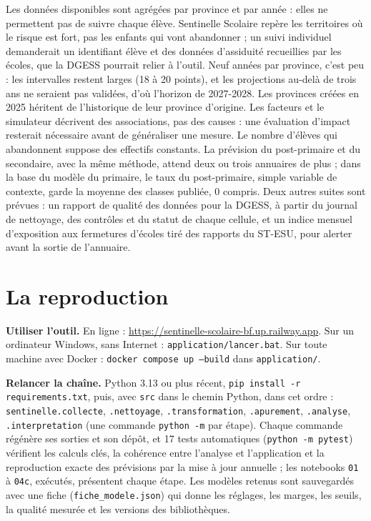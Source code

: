 \documentclass{article}
\newcommand{\sol}{Sentinelle Scolaire}
\newcommand{\lien}{\url{https://sentinelle-scolaire-bf.up.railway.app}}
\begin{document}
Les données disponibles sont agrégées par province et par année : elles ne permettent pas de suivre chaque élève. \sol{} repère les territoires où le risque est fort, pas les enfants qui vont abandonner ; un suivi individuel demanderait un identifiant élève et des données d'assiduité recueillies par les écoles, que la DGESS pourrait relier à l'outil. Neuf années par province, c'est peu : les intervalles restent larges (18 à 20 points), et les projections au-delà de trois ans ne seraient pas validées, d'où l'horizon de 2027-2028. Les provinces créées en 2025 héritent de l'historique de leur province d'origine. Les facteurs et le simulateur décrivent des associations, pas des causes : une évaluation d'impact resterait nécessaire avant de généraliser une mesure. Le nombre d'élèves qui abandonnent suppose des effectifs constants. La prévision du post-primaire et du secondaire, avec la même méthode, attend deux ou trois annuaires de plus ; dans la base du modèle du primaire, le taux du post-primaire, simple variable de contexte, garde la moyenne des classes publiée, 0 compris. Deux autres suites sont prévues : un rapport de qualité des données pour la DGESS, à partir du journal de nettoyage, des contrôles et du statut de chaque cellule, et un indice mensuel d'exposition aux fermetures d'écoles tiré des rapports du ST-ESU, pour alerter avant la sortie de l'annuaire.

\section{La reproduction}

\textbf{Utiliser l'outil.} En ligne : \lien. Sur un ordinateur Windows, sans Internet : \texttt{application/lancer.bat}. Sur toute machine avec Docker : \texttt{docker compose up --build} dans \texttt{application/}.

\textbf{Relancer la chaîne.} Python 3.13 ou plus récent, \texttt{pip install -r requirements.txt}, puis, avec \texttt{src} dans le chemin Python, dans cet ordre : \texttt{sentinelle.collecte}, \texttt{.nettoyage}, \texttt{.transformation}, \texttt{.apurement}, \texttt{.analyse}, \texttt{.interpretation} (une commande \texttt{python -m} par étape). Chaque commande régénère ses sorties et son dépôt, et 17 tests automatiques (\texttt{python -m pytest}) vérifient les calculs clés, la cohérence entre l'analyse et l'application et la reproduction exacte des prévisions par la mise à jour annuelle ; les notebooks \texttt{01} à \texttt{04c}, exécutés, présentent chaque étape. Les modèles retenus sont sauvegardés avec une fiche (\texttt{fiche\_modele.json}) qui donne les réglages, les marges, les seuils, la qualité mesurée et les versions des bibliothèques.
\end{document}
